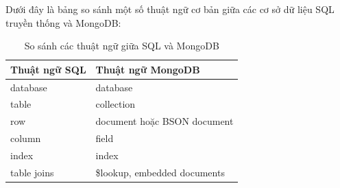 	Dưới đây là bảng so sánh một số thuật ngữ cơ bản giữa các cơ sở dữ liệu SQL truyền thống và MongoDB:
	\begin{table}[H]
		\centering
		\setlength\extrarowheight{3pt}
		\begin{tabular}{|l|l|}
			\hline
			\textbf{Thuật ngữ SQL}	& \textbf{Thuật ngữ MongoDB}  \\\hline
			database	& database \\\hline
			table		& collection \\\hline
			row			& document hoặc BSON document \\\hline
			column		& field \\\hline
			index		& index \\\hline
			table joins	& \$lookup, embedded documents \\\hline
		\end{tabular}
		\caption{So sánh các thuật ngữ giữa SQL và MongoDB}
		\label{tab:table_3_1}
	\end{table}
	
